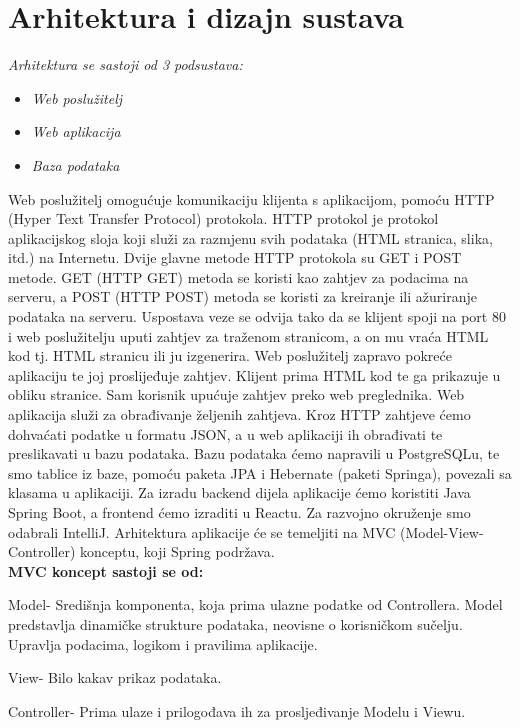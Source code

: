 \chapter{Arhitektura i dizajn sustava}
		

		\textit{Arhitektura se sastoji od 3 podsustava:}
	\begin{itemize}
		\item 	\textit{Web poslužitelj}
		\item 	\textit{Web aplikacija}
		\item 	\textit{Baza podataka}		
	\end{itemize}
	
			Web poslužitelj omogućuje komunikaciju klijenta s aplikacijom, pomoću HTTP (Hyper Text Transfer Protocol) protokola. HTTP protokol je protokol aplikacijskog sloja koji služi za razmjenu svih podataka (HTML stranica, slika, itd.) na Internetu. Dvije glavne metode HTTP protokola su GET i POST metode. GET (HTTP GET) metoda se koristi kao zahtjev za podacima na serveru, a POST (HTTP POST) metoda se koristi za kreiranje ili ažuriranje podataka na serveru. Uspostava veze se odvija tako da se klijent spoji na port 80 i web poslužitelju uputi zahtjev za traženom stranicom, a on mu vraća HTML kod tj. HTML stranicu ili ju izgenerira. Web poslužitelj zapravo pokreće aplikaciju te joj proslijeđuje zahtjev. Klijent prima HTML kod te ga prikazuje u obliku stranice. Sam korisnik upućuje zahtjev preko web preglednika. Web aplikacija služi za obrađivanje željenih zahtjeva. Kroz HTTP zahtjeve ćemo dohvaćati podatke u formatu JSON, a u web aplikaciji ih obrađivati te preslikavati u bazu podataka. Bazu podataka ćemo napravili u PostgreSQLu, te smo tablice iz baze, pomoću paketa JPA i Hebernate (paketi Springa), povezali sa klasama u aplikaciji. Za izradu backend dijela aplikacije ćemo koristiti Java Spring Boot, a frontend ćemo izraditi u Reactu. Za razvojno okruženje smo odabrali IntelliJ. Arhitektura aplikacije će se temeljiti na MVC (Model-View-Controller) konceptu, koji Spring podržava.\\
		
		
			\noindent \textbf{MVC koncept sastoji se od:}
				\begin{packed_item}
				\item Model- Središnja komponenta, koja prima ulazne podatke od Controllera. Model predstavlja dinamičke strukture podataka, neovisne o korisničkom sučelju. Upravlja podacima, logikom i pravilima aplikacije.	
				\item View- Bilo kakav prikaz podataka.
				\item Controller- Prima ulaze i prilogođava ih za prosljeđivanje Modelu i Viewu.
				\end{packed_item}
			
